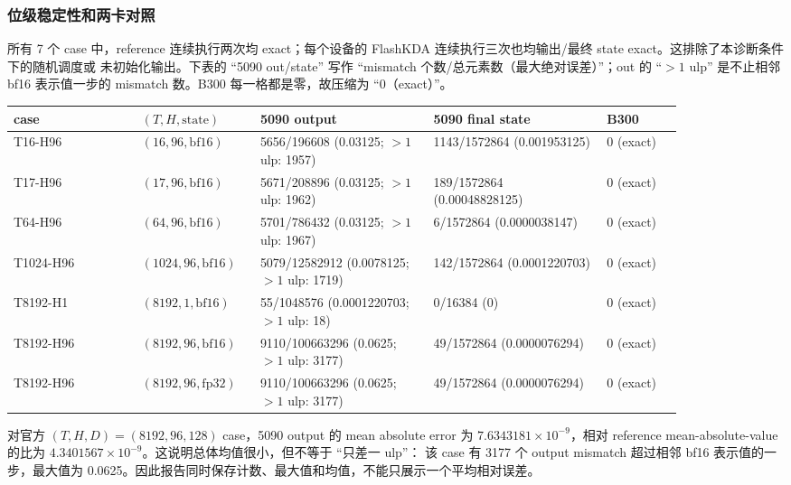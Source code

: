\documentclass[11pt,a4paper,fontset=none]{ctexart}
\begin{document}
\subsubsection{位级稳定性和两卡对照}

所有 7 个 case 中，reference 连续执行两次均 exact；每个设备的 FlashKDA
连续执行三次也均输出/最终 state exact。这排除了本诊断条件下的随机调度或
未初始化输出。下表的 ``5090 out/state'' 写作
``mismatch 个数/总元素数（最大绝对误差）''；out 的 ``$>1$ ulp'' 是不止相邻
bf16 表示值一步的 mismatch 数。B300 每一格都是零，故压缩为 ``0（exact）''。

{\footnotesize
\setlength{\tabcolsep}{2pt}
\begin{longtable}{@{}L{0.17\linewidth}L{0.13\linewidth}L{0.23\linewidth}L{0.23\linewidth}L{0.10\linewidth}@{}}
\toprule
case & \((T,H,\mathrm{state})\) & 5090 output & 5090 final state & B300 \\
\midrule
\endhead
\bottomrule
\endlastfoot
T16-H96 & \((16,96,\mathrm{bf16})\) & 5656/196608 (0.03125; $>1$ ulp: 1957) & 1143/1572864 (0.001953125) & 0 (exact) \\
T17-H96 & \((17,96,\mathrm{bf16})\) & 5671/208896 (0.03125; $>1$ ulp: 1962) & 189/1572864 (0.00048828125) & 0 (exact) \\
T64-H96 & \((64,96,\mathrm{bf16})\) & 5701/786432 (0.03125; $>1$ ulp: 1967) & 6/1572864 (0.0000038147) & 0 (exact) \\
T1024-H96 & \((1024,96,\mathrm{bf16})\) & 5079/12582912 (0.0078125; $>1$ ulp: 1719) & 142/1572864 (0.0001220703) & 0 (exact) \\
T8192-H1 & \((8192,1,\mathrm{bf16})\) & 55/1048576 (0.0001220703; $>1$ ulp: 18) & 0/16384 (0) & 0 (exact) \\
T8192-H96 & \((8192,96,\mathrm{bf16})\) & 9110/100663296 (0.0625; $>1$ ulp: 3177) & 49/1572864 (0.0000076294) & 0 (exact) \\
T8192-H96 & \((8192,96,\mathrm{fp32})\) & 9110/100663296 (0.0625; $>1$ ulp: 3177) & 49/1572864 (0.0000076294) & 0 (exact) \\
\end{longtable}
}

对官方 \((T,H,D)=(8192,96,128)\) case，5090 output 的 mean absolute error
为 \(7.6343181\times10^{-9}\)，相对 reference mean-absolute-value 的比为
\(4.3401567\times10^{-9}\)。这说明总体均值很小，但不等于 ``只差一 ulp''：
该 case 有 3177 个 output mismatch 超过相邻 bf16 表示值的一步，最大值为
0.0625。因此报告同时保存计数、最大值和均值，不能只展示一个平均相对误差。
\end{document}
